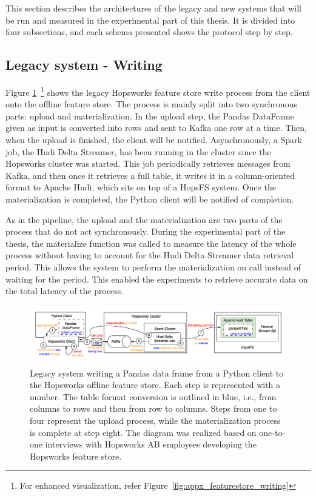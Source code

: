 This section describes the architectures of the legacy and new systems that will be run and measured in the experimental part of this thesis. It is divided into four subsections, and each schema presented shows the protocol step by step.

\subsection{Legacy system - Writing}
\label{subsec:legacy_sys_writing}

Figure \ref{fig:featurestore_writing}~\footnote{For enhanced visualization, refer Figure~\ref{fig:appx_featurestore_writing}} shows the legacy Hopsworks feature store write process from the client onto the offline feature store. The process is mainly split into two synchronous parts: upload and materialization. In the upload step, the Pandas DataFrame given as input is converted into rows and sent to Kafka one row at a time. Then, when the upload is finished, the client will be notified. Asynchronously, a Spark job, the Hudi Delta Streamer, has been running in the cluster since the Hopsworks cluster was started. This job periodically retrieves messages from Kafka, and then once it retrieves a full table, it writes it in a column-oriented format to Apache Hudi, which sits on top of a \gls{HopsFS} system. Once the materialization is completed, the Python client will be notified of completion.

As in the pipeline, the upload and the materialization are two parts of the process that do not act synchronously. During the experimental part of the thesis, the materialize function was called to measure the latency of the whole process without having to account for the Hudi Delta Streamer data retrieval period. This allows the system to perform the materialization on call instead of waiting for the period. This enabled the experiments to retrieve accurate data on the total latency of the process.

\begin{figure}
    \begin{center}
      \includegraphics[width=\textwidth]{figures/2-background/FeatureStore-writing.png}
    \end{center}
    \caption[Legacy system - Write process]{Legacy system writing a Pandas data frame from a Python client to the Hopsworks offline feature store. Each step is represented with a number. The table format conversion is outlined in blue, i.e., from columns to rows and then from row to columns. Steps from one to four represent the upload process, while the materialization process is complete at step eight. The diagram was realized based on one-to-one interviews with Hopsworks AB employees developing the Hopsworks feature store.}
    \label{fig:featurestore_writing}
\end{figure}

